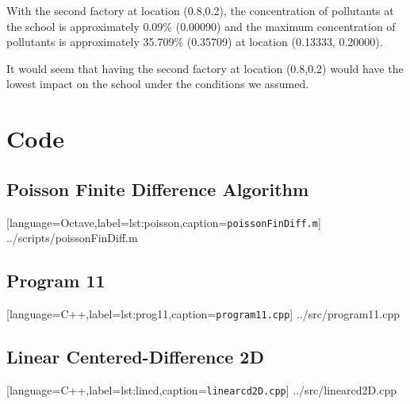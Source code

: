 \documentclass[12pt]{article}
\begin{document}
With the second factory at location (0.8,0.2), the concentration of
pollutants at the school is approximately 0.09\% (0.00090) and the maximum
concentration of pollutants is approximately 35.709\% (0.35709) at
location (0.13333, 0.20000).

It would seem that having the second factory at location (0.8,0.2)
would have the lowest impact on the school under the conditions we assumed.
\pagebreak
\section{Code}
\subsection{Poisson Finite Difference Algorithm}

[language=Octave,label=lst:poisson,caption=\texttt{poissonFinDiff.m}]
{../scripts/poissonFinDiff.m}
\pagebreak
\subsection{Program 11}

[language=C++,label=lst:prog11,caption=\texttt{program11.cpp}]
{../src/program11.cpp}
\pagebreak
\subsection{Linear Centered-Difference 2D}

[language=C++,label=lst:lincd,caption=\texttt{linearcd2D.cpp}]
{../src/linearcd2D.cpp}
\end{document}
